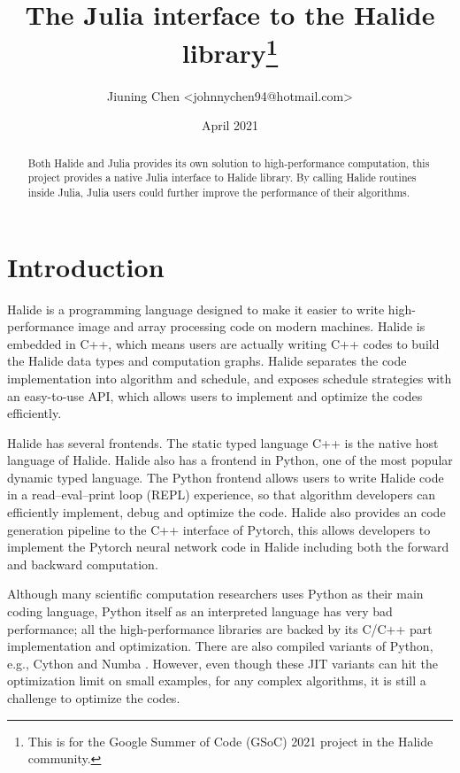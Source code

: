 \documentclass{article}
\title{The Julia interface to the Halide library\footnote{This is for the Google Summer of Code (GSoC) 2021 project in the Halide community.}}
\author{Jiuning Chen <johnnychen94@hotmail.com>}
\date{April 2021}
\begin{document}
\maketitle
\begin{abstract}
   Both Halide and Julia provides its own solution to high-performance computation, this project provides a native Julia interface to Halide library. By calling Halide routines inside Julia, Julia users could further improve the performance of their algorithms.
\end{abstract}

\tableofcontents

\section{Introduction}

Halide\cite{ragan2012decoupling, ragan2013halide, ragan2014decoupling} is a programming language designed to make it easier to write high-performance image and array processing code on modern machines. Halide is embedded in C++, which means users are actually writing C++ codes to build the Halide data types and computation graphs. Halide separates the code implementation into algorithm and schedule, and exposes schedule strategies with an easy-to-use API, which allows users to implement and optimize the codes efficiently.

Halide has several frontends. The static typed language C++ is the native host language of Halide. Halide also has a frontend in Python, one of the most popular dynamic typed language. The Python frontend allows users to write Halide code in a read–eval–print loop (REPL) experience, so that algorithm developers can efficiently implement, debug and optimize the code. Halide also provides an code generation pipeline to the C++ interface of Pytorch, this allows developers to implement the Pytorch neural network code in Halide including both the forward and backward computation.

Although many scientific computation researchers uses Python as their main coding language, Python itself as an interpreted language has very bad performance; all the high-performance libraries are backed by its C/C++ part implementation and optimization. There are also compiled variants of Python, e.g., Cython \cite{behnel2010cython} and Numba \cite{lam2015numba}. However, even though these JIT variants can hit the optimization limit on small examples, for any complex algorithms, it is still a challenge to optimize the codes.
\end{document}
